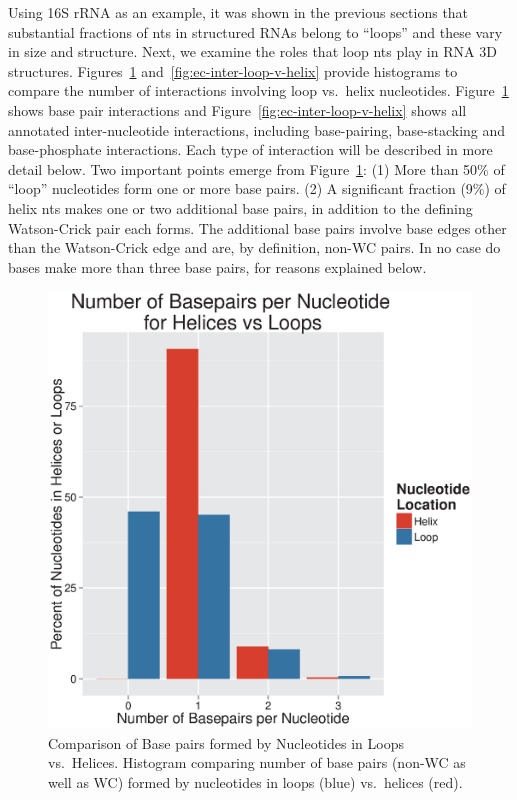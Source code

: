 Using 16S rRNA as an example, it was shown in the previous sections that
substantial fractions of nts in structured RNAs belong to ``loops'' and these
vary in size and structure. Next, we examine the roles that loop nts play in RNA
3D structures. Figures~\ref{fig:ec-bp-loop-v-helix}
and~\ref{fig:ec-inter-loop-v-helix} provide histograms to compare the number of
interactions involving loop vs.\ helix nucleotides.
Figure~\ref{fig:ec-bp-loop-v-helix} shows base pair interactions and
Figure~\ref{fig:ec-inter-loop-v-helix} shows all annotated inter-nucleotide
interactions, including base-pairing, base-stacking and base-phosphate
interactions. Each type of interaction will be described in more detail below.
Two important points emerge from Figure~\ref{fig:ec-bp-loop-v-helix}: (1) More
than 50\% of ``loop'' nucleotides form one or more base pairs. (2) A significant
fraction (9\%) of helix nts makes one or two additional base pairs, in addition
to the defining Watson-Crick pair each forms. The additional base pairs involve
base edges other than the Watson-Crick edge and are, by definition, non-WC
pairs. In no case do bases make more than three base pairs, for reasons
explained below.

\begin{figure}
  \includegraphics[width=0.5\linewidth]{chapter-1/figs/bp-loop-v-helix}
  \caption{Comparison of Base pairs formed by Nucleotides in Loops vs.\ Helices.
    Histogram comparing number of base pairs (non-WC as well as WC) formed by
  nucleotides in loops (blue) vs.\ helices (red).}
\label{fig:ec-bp-loop-v-helix}
\end{figure}

